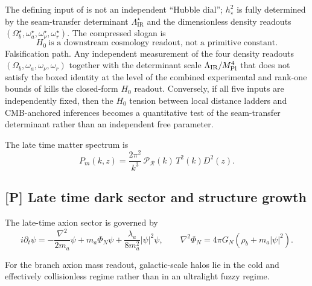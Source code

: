 \begin{remark}
The defining input of  is not an independent ``Hubble dial'';
$h_\star^2$ is fully determined by the seam-transfer determinant $\Lambda_{\mathrm{IR}}^\star$ and
the dimensionless density readouts $(\Omega_b^\star,\omega_a^\star,\omega_\nu^\star,\omega_r^\star)$.
The compressed slogan is
\[
\boxed{\;H_0\ \text{is a downstream cosmology readout, not a primitive constant.}\;}
\]
Falsification path. Any independent measurement of the four density readouts
$(\Omega_b,\omega_a,\omega_\nu,\omega_r)$ together with the determinant scale
$\Lambda_{\mathrm{IR}}/M_{\mathrm{Pl}}^4$ that does not satisfy the boxed identity at the level of the
combined experimental and rank-one bounds of  kills the closed-form
$H_0$ readout. Conversely, if all five inputs are independently fixed, then the
$H_0$ tension between local distance ladders and CMB-anchored inferences becomes a quantitative test
of the seam-transfer determinant rather than an independent free parameter.
\end{remark}

\begin{conjecture}
\label{cor:matter_power_spectrum_readout}
The late time matter spectrum is
\[
P_m(k,z)=\frac{2\pi^2}{k^3}\,\mathcal P_{\mathcal R}(k)\,T^2(k)D^2(z).
\]
\end{conjecture}

\subsection{[P] Late time dark sector and structure growth}

\begin{conjecture}
\label{thm:axion_schrodinger_poisson_closure}
The late-time axion sector is governed by
\[
i\partial_t\psi
=
-\frac{\nabla^2}{2m_a}\psi+m_a\Phi_N\psi+\frac{\lambda_a}{8m_a^2}|\psi|^2\psi,
\qquad
\nabla^2\Phi_N=4\pi G_N(\rho_b+m_a|\psi|^2).
\]
\end{conjecture}

\begin{conjecture}
\label{cor:no_fuzzy_halo_regime}
For the branch axion mass readout, galactic-scale halos lie in the cold and effectively
collisionless regime rather than in an ultralight fuzzy regime.
\end{conjecture}

